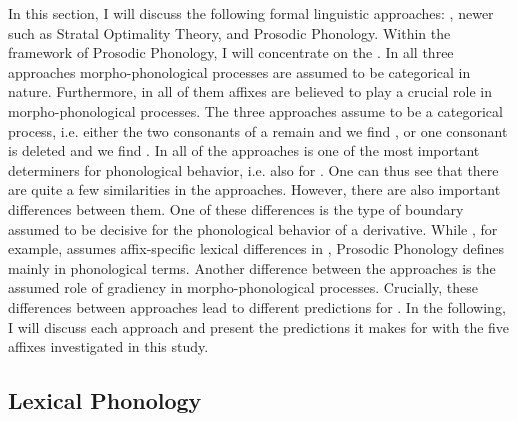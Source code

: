 In this section, I will discuss the following formal linguistic approaches: , newer  such as Stratal Optimality Theory, and Prosodic Phonology. Within the framework of Prosodic Phonology, I will concentrate on the .  In all three approaches morpho-phonological processes are assumed to be categorical in nature. Furthermore, in all of them affixes are believed to play a crucial role in morpho-phonological processes. The three approaches assume  to be a categorical process, i.e. either the two consonants of a  remain and we find , or one consonant is deleted and we find . In all of the approaches  is one of the most important determiners for phonological behavior, i.e. also for . 
One can thus see that there are quite a few similarities in the approaches. However, there are also important differences between them. One of these differences is the type of boundary assumed to be decisive for the phonological behavior of a derivative. While , for example, assumes affix-specific lexical differences in , Prosodic Phonology defines  mainly in phonological terms. 
Another difference between the approaches is the assumed role of gradiency in morpho-phonological processes.
Crucially, these differences between approaches lead to different predictions for . In the following, I will discuss each approach and present the predictions it makes for  with the five affixes investigated in this study.


\subsection{Lexical Phonology} \label{LexPhon}



